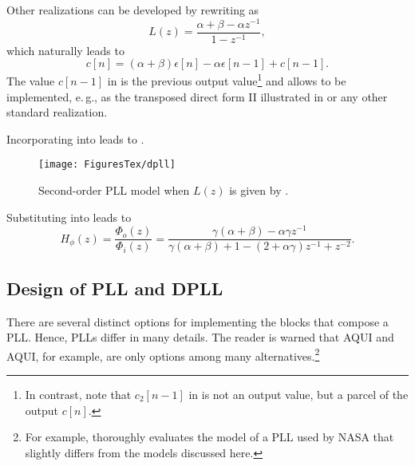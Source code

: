 Other realizations
can be developed by rewriting  as
\begin{equation}
L(z) = \frac{\alpha + \beta - \alpha z^{-1}}{1-z^{-1}},
\label{eq:pllLzSecondOrder2}
\end{equation}
which naturally leads to 
\begin{equation}
c[n] = (\alpha+\beta)\epsilon[n]  - \alpha \epsilon[n-1] + c[n-1].
\label{eq:pllDifferenceEq2}
\end{equation}
The value $c[n-1]$ in  is the previous output value\footnote{In contrast, note that $c_2[n-1]$ in  is not an output value, but a parcel of the output $c[n]$.} and allows  to be implemented, e.\,g.,  as the transposed direct form II illustrated in  or any other standard realization.

Incorporating  into  leads to 
.

\begin{figure}[htbp]
	\centering
		\texttt{[image: FiguresTex/dpll]}		
	\caption{Second-order PLL model when $L(z)$ is given by .\label{fig:dpll}}
\end{figure}

Substituting  into  leads to
\begin{equation}
H_{\phi}(z) = \frac{\Phi_o(z)}{\Phi_i(z)} = \frac{\gamma(\alpha+\beta) - \alpha \gamma z^{-1}}{\gamma(\alpha+\beta)+1 - (2+\alpha \gamma) z^{-1} + z^{-2}}.
\label{eq:pllTransferFunctionDiscreteTimeComplete}
\end{equation}


\subsection{Design of PLL and DPLL}

There are several distinct options for implementing the blocks that compose a PLL. Hence,
PLLs differ in many details. The reader is warned that {AQUI} and {AQUI}, for example,
are only options among many alternatives.\footnote{
For example, \cite{Nguyen94} thoroughly evaluates the model of a PLL used by NASA that
slightly differs from the models discussed here.}

